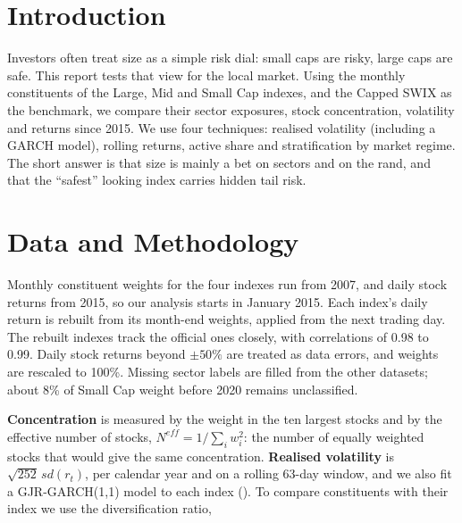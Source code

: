 \documentclass[11pt,preprint]{elsarticle}
\numberwithin{equation}{section}
\numberwithin{figure}{section}
\numberwithin{table}{section}
\begin{document}

\headsep 35pt %




\section{\texorpdfstring{Introduction
\label{Introduction}}{Introduction }}\label{introduction}

Investors often treat size as a simple risk dial: small caps are risky,
large caps are safe. This report tests that view for the local market.
Using the monthly constituents of the Large, Mid and Small Cap indexes,
and the Capped SWIX as the benchmark, we compare their sector exposures,
stock concentration, volatility and returns since 2015. We use four
techniques: realised volatility (including a GARCH model), rolling
returns, active share and stratification by market regime. The short
answer is that size is mainly a bet on sectors and on the rand, and that
the ``safest'' looking index carries hidden tail risk.

\section{\texorpdfstring{Data and Methodology
\label{Data}}{Data and Methodology }}\label{data-and-methodology}

Monthly constituent weights for the four indexes run from 2007, and
daily stock returns from 2015, so our analysis starts in January 2015.
Each index's daily return is rebuilt from its month-end weights, applied
from the next trading day. The rebuilt indexes track the official ones
closely, with correlations of 0.98 to 0.99. Daily stock returns beyond
\(\pm 50\%\) are treated as data errors, and weights are rescaled to
100\%. Missing sector labels are filled from the other datasets; about
8\% of Small Cap weight before 2020 remains unclassified.

\textbf{Concentration} is measured by the weight in the ten largest
stocks and by the effective number of stocks,
\(N^{eff} = 1/\sum_i w_i^2\): the number of equally weighted stocks that
would give the same concentration. \textbf{Realised volatility} is
\(\sqrt{252}\,sd(r_t)\), per calendar year and on a rolling 63-day
window, and we also fit a GJR-GARCH(1,1) model to each index
(). To
compare constituents with their index we use the diversification ratio,
\end{document}
